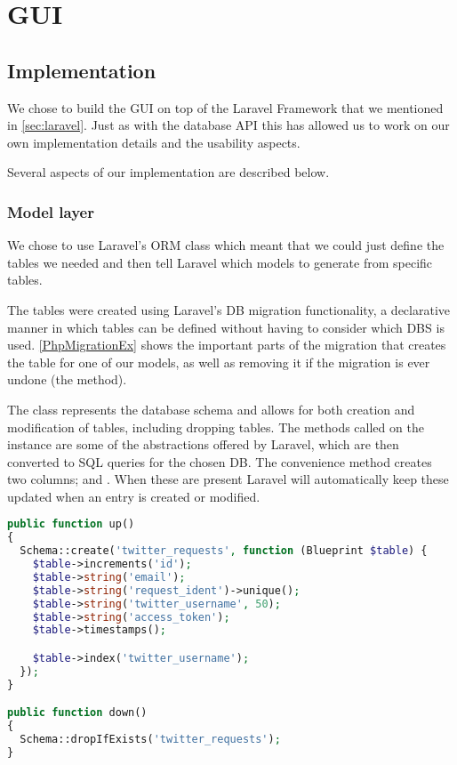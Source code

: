 \chapter{GUI} \label{GUI}

\section{Implementation}
We chose to build the \ac{GUI} on top of the Laravel Framework that we mentioned
in \autoref{sec:laravel}. Just as with the database \ac{API} this has allowed us
to work on our own implementation details and the usability aspects.\nl

Several aspects of our implementation are described below.

\subsection{Model layer}
We chose to use Laravel's \ac{ORM} class which meant that we could just define
the tables we needed and then tell Laravel which models to generate from
specific tables.\nl

The tables were created using Laravel's \ac{DB} migration functionality, a
declarative manner in which tables can be defined without having to consider
which \ac{DBS} is used. \autoref{PhpMigrationEx} shows the important parts of
the migration that creates the table for one of our models, as well as removing
it if the migration is ever undone (the  method).\nl

The  class represents the database schema and allows for both
creation and modification of tables, including dropping tables. The methods
called on the  instance  are some of the abstractions
offered by Laravel, which are then converted to \ac{SQL} queries for the chosen
\ac{DB}. The convenience method  creates two columns;
 and . When these are present Laravel will
automatically keep these updated when an entry is created or modified.

\begin{minipage}[H]{\linewidth}
\begin{lstlisting}[caption = Example of a migration in Laravel, label =
PhpMigrationEx, language = PHP, style = PHP]
public function up()
{
  Schema::create('twitter_requests', function (Blueprint $table) {
    $table->increments('id');
    $table->string('email');
    $table->string('request_ident')->unique();
    $table->string('twitter_username', 50);
    $table->string('access_token');
    $table->timestamps();

    $table->index('twitter_username');
  });
}

public function down()
{
  Schema::dropIfExists('twitter_requests');
}
\end{lstlisting}
\end{minipage}

